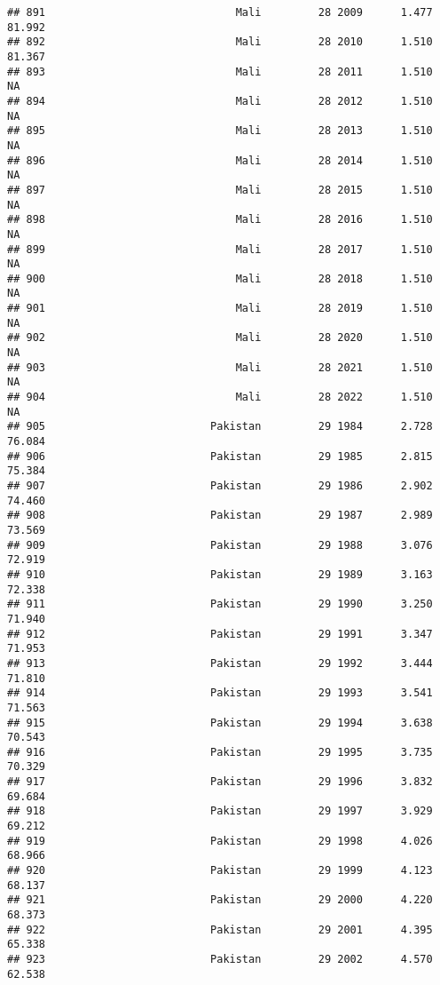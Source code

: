 \documentclass[
]{article}
\begin{document}
\begin{verbatim}
## 891                              Mali         28 2009      1.477     81.992
## 892                              Mali         28 2010      1.510     81.367
## 893                              Mali         28 2011      1.510         NA
## 894                              Mali         28 2012      1.510         NA
## 895                              Mali         28 2013      1.510         NA
## 896                              Mali         28 2014      1.510         NA
## 897                              Mali         28 2015      1.510         NA
## 898                              Mali         28 2016      1.510         NA
## 899                              Mali         28 2017      1.510         NA
## 900                              Mali         28 2018      1.510         NA
## 901                              Mali         28 2019      1.510         NA
## 902                              Mali         28 2020      1.510         NA
## 903                              Mali         28 2021      1.510         NA
## 904                              Mali         28 2022      1.510         NA
## 905                          Pakistan         29 1984      2.728     76.084
## 906                          Pakistan         29 1985      2.815     75.384
## 907                          Pakistan         29 1986      2.902     74.460
## 908                          Pakistan         29 1987      2.989     73.569
## 909                          Pakistan         29 1988      3.076     72.919
## 910                          Pakistan         29 1989      3.163     72.338
## 911                          Pakistan         29 1990      3.250     71.940
## 912                          Pakistan         29 1991      3.347     71.953
## 913                          Pakistan         29 1992      3.444     71.810
## 914                          Pakistan         29 1993      3.541     71.563
## 915                          Pakistan         29 1994      3.638     70.543
## 916                          Pakistan         29 1995      3.735     70.329
## 917                          Pakistan         29 1996      3.832     69.684
## 918                          Pakistan         29 1997      3.929     69.212
## 919                          Pakistan         29 1998      4.026     68.966
## 920                          Pakistan         29 1999      4.123     68.137
## 921                          Pakistan         29 2000      4.220     68.373
## 922                          Pakistan         29 2001      4.395     65.338
## 923                          Pakistan         29 2002      4.570     62.538

\end{verbatim}
\end{document}
